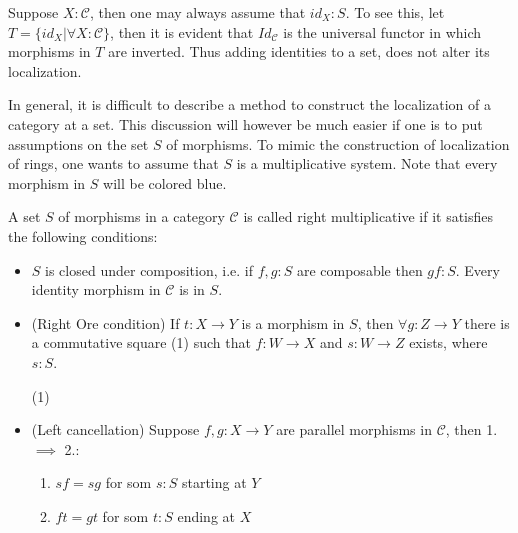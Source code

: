     \begin{remark}
        Suppose $X:\mathcal{C}$, then one may always assume that $id_{X}:S$. To see this, let $T = \{id_{X} |\forall X:\mathcal{C} \}$, then it is evident that $Id_{\mathcal{C}}$ is the universal functor in which morphisms in $T$ are inverted. Thus adding identities to a set, does not alter its localization.
    \end{remark}

    In general, it is difficult to describe a method to construct the localization of a category at a set. This discussion will however be much easier if one is to put assumptions on the set $S$ of morphisms. To mimic the construction of localization of rings, one wants to assume that $S$ is a multiplicative system. Note that every morphism in $S$ will be colored blue.

    \begin{definition}
        A set $S$ of morphisms in a category $\mathcal{C}$ is called right multiplicative if it satisfies the following conditions:
        \begin{itemize}
            \item $S$ is closed under composition, i.e. if $f,g : S$ are composable then $gf : S$. Every identity morphism in $\mathcal{C}$ is in $S$.
            \item (Right Ore condition) If $t : X \rightarrow Y$ is a morphism in $S$, then $\forall g:Z\rightarrow Y$ there is a commutative square (1) such that $f:W\rightarrow X$ and $s:W\rightarrow Z$ exists, where $s:S$.
            \begin{center}
                (1)
            \end{center}
            \item (Left cancellation) Suppose $f,g:X\rightarrow Y$ are parallel morphisms in $\mathcal{C}$, then 1. $\implies$ 2.:
            \begin{enumerate}
                \item $sf = sg$ for som $s:S$ starting at $Y$
                \item $ft = gt$ for som $t:S$ ending at $X$
            \end{enumerate}
        \end{itemize}
    \end{definition}

